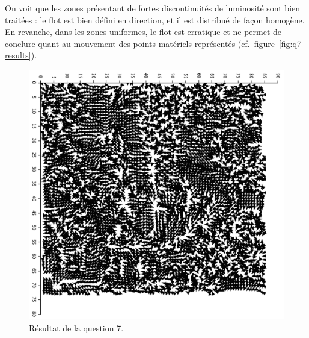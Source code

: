 \begin{enumerate}[questions]
On voit que les zones présentant de fortes discontinuités de luminosité sont bien traitées : le flot est bien défini en direction, et il est distribué de façon homogène. En revanche, dans les zones uniformes, le flot est erratique et ne permet de conclure quant au mouvement des points matériels représentés (cf.~figure~\vref{fig:q7-results}).
\begin{figure}
\centering
\includegraphics[width=.7\textwidth]{img/q7-results}
\caption{Résultat de la question 7.\label{fig:q7-results}}
\end{figure}
\end{enumerate}
